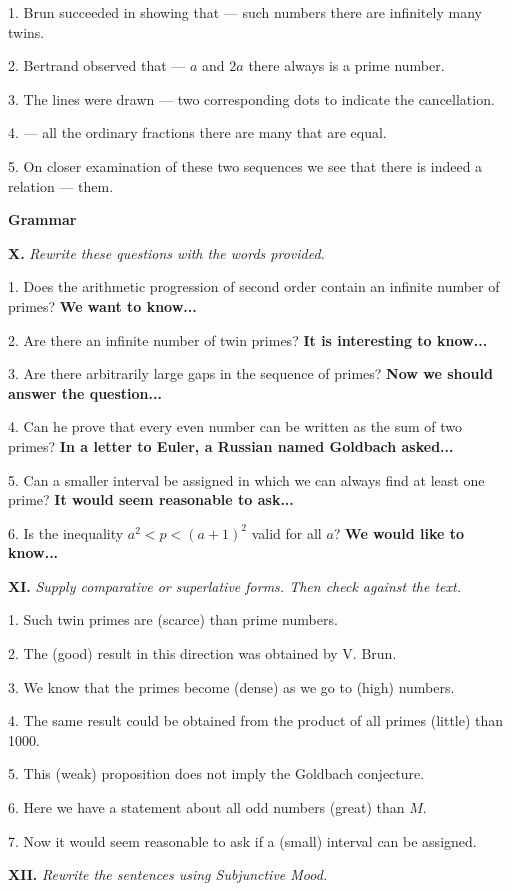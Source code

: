 \documentclass[a4paper]{article}
\newcommand{\ESect}[1]{\medskip\par{\large \textbf{#1}}\par}
\newcommand{\ETask}[2]{\medskip\par\textbf{#1.} \textit{#2}\par}
\begin{document}
1. Brun succeeded in showing that --- such numbers there are infinitely many twins.

2. Bertrand observed that --- $a$ and $2a$ there always is a prime number.

3. The lines were drawn --- two corresponding dots to indicate the cancellation.

4. --- all the ordinary fractions there are many that are equal.

5. On closer examination of these two sequences we see that there is indeed a relation --- them.

\ESect{Grammar}

\ETask{X}{Rewrite these questions with the words provided.}

1. Does the arithmetic progression of second order contain an infinite number of primes? \textbf{We want to know...}

2. Are there an infinite number of twin primes? \textbf{It is interesting to know...}

3. Are there arbitrarily large gaps in the sequence of primes? \textbf{Now we should answer the question...}

4. Can he prove that every even number can be written as the sum of two primes? \textbf{In a letter to Euler, a Russian named
Goldbach asked...}

5. Can a smaller interval be assigned in which we can always find at least one prime? \textbf{It would seem reasonable to ask...}

6. Is the inequality $a^2<p<(a+1)^2$ valid for all $a$? \textbf{We would like to know...}

\ETask{XI}{Supply comparative or superlative forms. Then check against the text.}

1. Such twin primes are (scarce) than prime numbers.

2. The (good) result in this direction was obtained by V. Brun.

3. We know that the primes become (dense) as we go to (high) numbers.

4. The same result could be obtained from the product of all primes (little) than 1000.

5. This (weak) proposition does not imply the Goldbach conjecture.

6. Here we have a statement about all odd numbers (great) than $M$.

7. Now it would seem reasonable to ask if a (small) interval can be assigned.

\ETask{XII}{Rewrite the sentences using Subjunctive Mood.}
\end{document}
